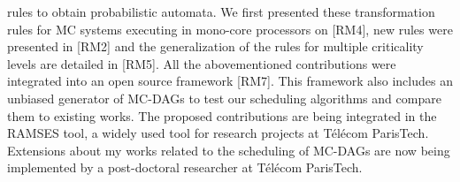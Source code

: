\documentclass{article}
\begin{document}
rules to obtain
probabilistic automata. We first presented these transformation rules for MC systems executing in 
mono-core processors
on [RM4], new rules were presented in [RM2] and the generalization of the rules for multiple criticality 
levels are detailed in
[RM5].
All the abovementioned contributions were integrated into an open source framework [RM7]. This 
framework also includes
an unbiased generator of MC-DAGs to test our scheduling algorithms and compare them to existing works. 
The proposed
contributions are being integrated in the RAMSES tool, a widely used tool for research projects at Télécom 
ParisTech.
Extensions about my works related to the scheduling of MC-DAGs are now being implemented by a 
post-doctoral researcher
at Télécom ParisTech.
\end{document}
